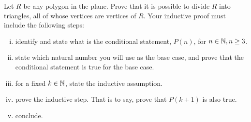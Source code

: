 \begin{question}	
	\normalfont
Let $R$ be any polygon in the plane. Prove that it is possible to divide $R$ into triangles, all of whose vertices are vertices of $R$.
Your inductive proof must include the following steps:
	\begin{enumerate}[(i)]
		\item identify and state what is the conditional statement, $P(n)$, for $n\in \mathbb{N}, n \geq 3$.
		\item state which natural number you will use as the base case, and prove that the conditional statement is true for the base case.
		\item for a fixed $k\in\mathbb{N}$, state the inductive assumption.
		\item prove the inductive step.  That is to say, prove that $P(k+1)$ is also true.
		\item conclude.
	\end{enumerate}
\end{question}